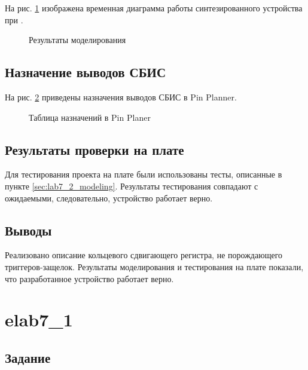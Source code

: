 На рис. \ref{fig:lab7_2_modeling} изображена временная диаграмма работы синтезированного устройства при .

\begin{figure}[H]
\begin{center}
	\caption{Результаты моделирования}
	\label{fig:lab7_2_modeling}
\end{center}
\end{figure}

\subsection{Назначение выводов СБИС}

На рис. \ref{fig:lab7_2_pins} приведены назначения выводов СБИС в Pin Planner.

\begin{figure}[H]
\begin{center}
	\caption{Таблица назначений в Pin Planer}
	\label{fig:lab7_2_pins}
\end{center}
\end{figure}

\subsection{Результаты проверки на плате}

Для тестирования проекта на плате были использованы тесты, описанные в пункте \ref{sec:lab7_2_modeling}. Результаты тестирования совпадают с ожидаемыми, следовательно, устройство работает верно.

\subsection{Выводы}

Реализовано описание кольцевого сдвигающего регистра, не порождающего триггеров-защелок. Результаты моделирования и тестирования на плате показали, что разработанное устройство работает верно.

\newpage

\section{elab7\_1}

\subsection{Задание}

